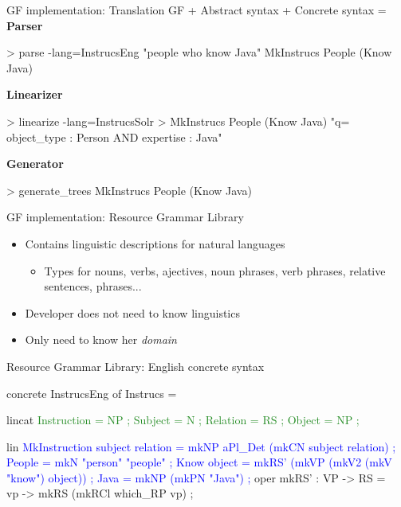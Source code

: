 \begin{frame}[fragile]{GF implementation: Translation}
GF + Abstract syntax + Concrete syntax = \pause
\newline
\newline
\textbf{Parser}
\begin{semiverbatim}
> parse -lang=InstrucsEng \textcolor{String}{"people who know Java"}
MkInstrucs People (Know Java)
\end{semiverbatim} \pause
\textbf{Linearizer}
\begin{semiverbatim}
> linearize -lang=InstrucsSolr 
>                  MkInstrucs People (Know Java)
\textcolor{String}{"q= object_type : Person AND expertise : Java"}
\end{semiverbatim} \pause
\textbf{Generator}
\begin{semiverbatim}
> generate_trees
MkInstrucs People (Know Java)
\end{semiverbatim}
\end{frame}
\begin{frame}[fragile]{GF implementation: Resource Grammar Library}\pause
\begin{itemize}
\item Contains linguistic descriptions for natural languages\pause
  \begin{itemize}
    \item Types for nouns, verbs, ajectives, noun phrases, verb phrases, relative sentences, phrases...\pause
  \end{itemize}
  \item Developer does not need to know linguistics\pause
  \item Only need to know her \emph{domain}
\end{itemize}
\end{frame}
\begin{frame}[fragile]{Resource Grammar Library: English concrete syntax}
\begin{semiverbatim}
concrete InstrucsEng of Instrucs = {
  lincat\textcolor{ForestGreen}{
    Instruction = \textcolor{Type}{NP} ;
    Subject = \textcolor{Type}{N} ;
    Relation = \textcolor{Type}{RS} ;
    Object = \textcolor{Type}{NP} ;}\pause

  lin\textcolor{Blue}{
   MkInstruction subject relation = 
                    mkNP aPl_Det (mkCN subject relation) ;
   People = mkN \textcolor{String}{"person" "people"} ;
   Know object = mkRS' (mkVP (mkV2 (mkV \textcolor{String}{"know"}) object)) ;
   Java = mkNP (mkPN \textcolor{String}{"Java"}) ; }
  oper
     mkRS' : \textcolor{Type}{VP} -> \textcolor{Type}{RS} = \\vp -> mkRS (mkRCl which_RP vp) ;
}
\end{semiverbatim}
\end{frame}

